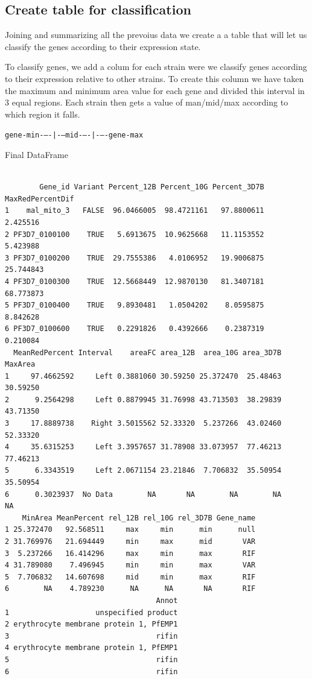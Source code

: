 \documentclass[11pt]{article}
\begin{document}
\subsection{Create table for classification}
\label{sec:orged8a6d3}

Joining and summarizing all the prevoius data we create a a table that will let us classify the genes according to their expression state.

To classify genes, we add a colum for each strain were we classify genes according to their expression relative to other strains.
To create this column we have taken the maximum and minimum area value for each gene and divided this interval in 3 equal regions. Each strain then gets a value of man/mid/max according to which region it falls.

\texttt{gene-min-{}--{}-|-{}--mid-{}--{}-|-{}--{}-gene-max}

Final DataFrame
\begin{verbatim}

        Gene_id Variant Percent_12B Percent_10G Percent_3D7B MaxRedPercentDif
1    mal_mito_3   FALSE  96.0466005  98.4721161   97.8800611         2.425516
2 PF3D7_0100100    TRUE   5.6913675  10.9625668   11.1153552         5.423988
3 PF3D7_0100200    TRUE  29.7555386   4.0106952   19.9006875        25.744843
4 PF3D7_0100300    TRUE  12.5668449  12.9870130   81.3407181        68.773873
5 PF3D7_0100400    TRUE   9.8930481   1.0504202    8.0595875         8.842628
6 PF3D7_0100600    TRUE   0.2291826   0.4392666    0.2387319         0.210084
  MeanRedPercent Interval    areaFC area_12B  area_10G area_3D7B  MaxArea
1     97.4662592     Left 0.3881060 30.59250 25.372470  25.48463 30.59250
2      9.2564298     Left 0.8879945 31.76998 43.713503  38.29839 43.71350
3     17.8889738    Right 3.5015562 52.33320  5.237266  43.02460 52.33320
4     35.6315253     Left 3.3957657 31.78908 33.073957  77.46213 77.46213
5      6.3343519     Left 2.0671154 23.21846  7.706832  35.50954 35.50954
6      0.3023937  No Data        NA       NA        NA        NA       NA
    MinArea MeanPercent rel_12B rel_10G rel_3D7B Gene_name
1 25.372470   92.568511     max     min      min      null
2 31.769976   21.694449     min     max      mid       VAR
3  5.237266   16.414296     max     min      max       RIF
4 31.789080    7.496945     min     min      max       VAR
5  7.706832   14.607698     mid     min      max       RIF
6        NA    4.789230      NA      NA       NA       RIF
                                   Annot
1                    unspecified product
2 erythrocyte membrane protein 1, PfEMP1
3                                  rifin
4 erythrocyte membrane protein 1, PfEMP1
5                                  rifin
6                                  rifin
\end{verbatim}
\end{document}
